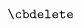 \documentclass[journal]{IEEEtran}
\newcommand{\mx}[1]{\mathbf{\bm{#1}}} 				%
\newcommand{\vc}[1]{\mathbf{\bm{#1}}} 					%
\DeclareMathOperator*{\st}{subject\,to}					%
\DeclareMathOperator*{\minimize}{minimize}				%
\DeclareMathOperator*{\find}{find}						%
\newcommand{\Rv}[1]{\ensuremath{\mathbb{R}^{#1}}}				%
\providecommand{\DIFaddbegin}{\protect\color{blue}} %
\providecommand{\DIFdelbegin}{\protect\cbdelete} %
\providecommand{\DIFdelend}{} %
\begin{document}
\begin{equation} \DIFdelbegin %
\DIFdelend \DIFaddbegin \label{eq:qp_rob} \begin{aligned}

\end{aligned}
\end{equation}
\end{document}
